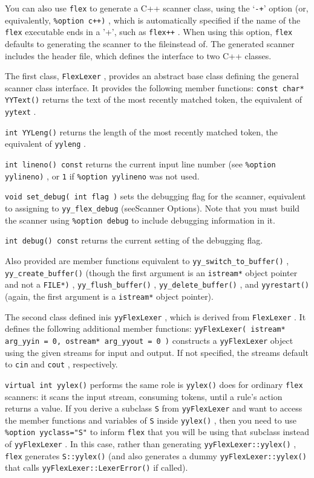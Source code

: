 \documentclass[openany,oneside]{book}
\begin{document}
You can also use \verb`flex` to generate a C++ scanner class, using the
‘\verb`-+`’ option (or, equivalently, \verb`%option c++)` , which is
automatically specified if the name of the \verb`flex` executable ends
in a '+', such as \verb`flex++` .  When using this option, \verb`flex` defaults to generating the scanner to the fileinstead
of.  The generated scanner includes the header file, which defines the interface to two C++ classes.

The first class, \verb`FlexLexer` ,
provides an abstract base class defining the general scanner class
interface.  It provides the following member functions: \verb`const char* YYText()` returns the text of the most recently matched token, the equivalent of \verb`yytext` .

 \verb`int YYLeng()` returns the length of the most recently matched token, the equivalent of \verb`yyleng` .

 \verb`int lineno() const` returns the current input line number (see \verb`%option yylineno)` , or \verb`1` if \verb`%option yylineno` was not used.

 \verb`void set_debug( int flag )` sets the debugging flag for the scanner, equivalent to assigning to \verb`yy_flex_debug` (seeScanner Options).  Note that you must build
the scanner using \verb`%option debug` to include debugging information
in it.

 \verb`int debug() const` returns the current setting of the debugging flag.

Also provided are member functions equivalent to \verb`yy_switch_to_buffer()` , \verb`yy_create_buffer()` (though the
first argument is an \verb`istream*` object pointer and not a \verb`FILE*)` , \verb`yy_flush_buffer()` , \verb`yy_delete_buffer()` , and \verb`yyrestart()` (again, the first argument is a \verb`istream*` object pointer).

The second class defined inis \verb`yyFlexLexer` ,
which is derived from \verb`FlexLexer` .  It defines the following
additional member functions: \verb`yyFlexLexer( istream* arg_yyin = 0, ostream* arg_yyout = 0 )` constructs a \verb`yyFlexLexer` object using the given streams for input
and output.  If not specified, the streams default to \verb`cin` and \verb`cout` , respectively.

 \verb`virtual int yylex()` performs the same role is \verb`yylex()` does for ordinary \verb`flex` scanners: it scans the input stream, consuming tokens, until a rule's
action returns a value.  If you derive a subclass \verb`S` from \verb`yyFlexLexer` and want to access the member functions and variables
of \verb`S` inside \verb`yylex()` , then you need to use \verb`%option yyclass="S"` to inform \verb`flex` that you will be using that subclass
instead of \verb`yyFlexLexer` .  In this case, rather than generating \verb`yyFlexLexer::yylex()` , \verb`flex` generates \verb`S::yylex()` (and also generates a dummy \verb`yyFlexLexer::yylex()` that calls \verb`yyFlexLexer::LexerError()` if called).
\end{document}
